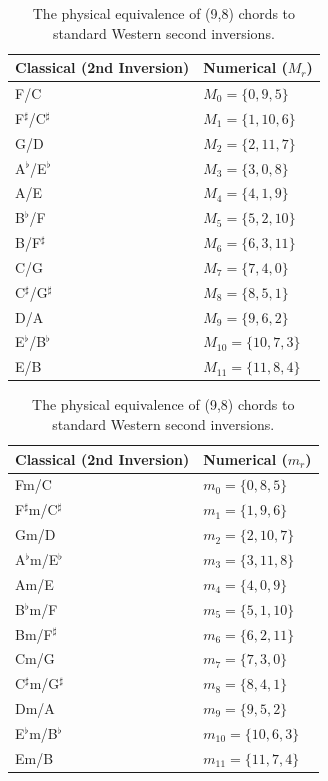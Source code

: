 \documentclass[11pt,letterpaper]{amsart}
\begin{document}
{\tiny \begin{table}[H]
    \centering
    \begin{minipage}{0.48\textwidth}
        \centering
        \begin{tabular}{ll}
        \toprule
        \textbf{Classical (2nd Inversion)} & \textbf{Numerical ($M_r$)} \\
        \midrule
        F/C & $M_0 = \{0, 9, 5\}$ \\
        F$^\sharp$/C$^\sharp$ & $M_1 = \{1, 10, 6\}$ \\
        G/D & $M_2 = \{2, 11, 7\}$ \\
        A$^\flat$/E$^\flat$ & $M_3 = \{3, 0, 8\}$ \\
        A/E & $M_4 = \{4, 1, 9\}$ \\
        B$^\flat$/F & $M_5 = \{5, 2, 10\}$ \\
        B/F$^\sharp$ & $M_6 = \{6, 3, 11\}$ \\
        C/G & $M_7 = \{7, 4, 0\}$ \\
        C$^\sharp$/G$^\sharp$ & $M_8 = \{8, 5, 1\}$ \\
        D/A & $M_9 = \{9, 6, 2\}$ \\
        E$^\flat$/B$^\flat$ & $M_{10} = \{10, 7, 3\}$ \\
        E/B & $M_{11} = \{11, 8, 4\}$ \\
        \bottomrule
        \end{tabular}
    \end{minipage}\hfill
    \begin{minipage}{0.48\textwidth}
        \centering
        \begin{tabular}{ll}
        \toprule
        \textbf{Classical (2nd Inversion)} & \textbf{Numerical ($m_r$)} \\
        \midrule
        Fm/C & $m_0 = \{0, 8, 5\}$ \\
        F$^\sharp$m/C$^\sharp$ & $m_1 = \{1, 9, 6\}$ \\
        Gm/D & $m_2 = \{2, 10, 7\}$ \\
        A$^\flat$m/E$^\flat$ & $m_3 = \{3, 11, 8\}$ \\
        Am/E & $m_4 = \{4, 0, 9\}$ \\
        B$^\flat$m/F & $m_5 = \{5, 1, 10\}$ \\
        Bm/F$^\sharp$ & $m_6 = \{6, 2, 11\}$ \\
        Cm/G & $m_7 = \{7, 3, 0\}$ \\
        C$^\sharp$m/G$^\sharp$ & $m_8 = \{8, 4, 1\}$ \\
        Dm/A & $m_9 = \{9, 5, 2\}$ \\
        E$^\flat$m/B$^\flat$ & $m_{10} = \{10, 6, 3\}$ \\
        Em/B & $m_{11} = \{11, 7, 4\}$ \\
        \bottomrule
        \end{tabular}
    \end{minipage}
    \caption{The physical equivalence of (9,8) chords to standard Western second inversions.}
\end{table}}
\end{document}
